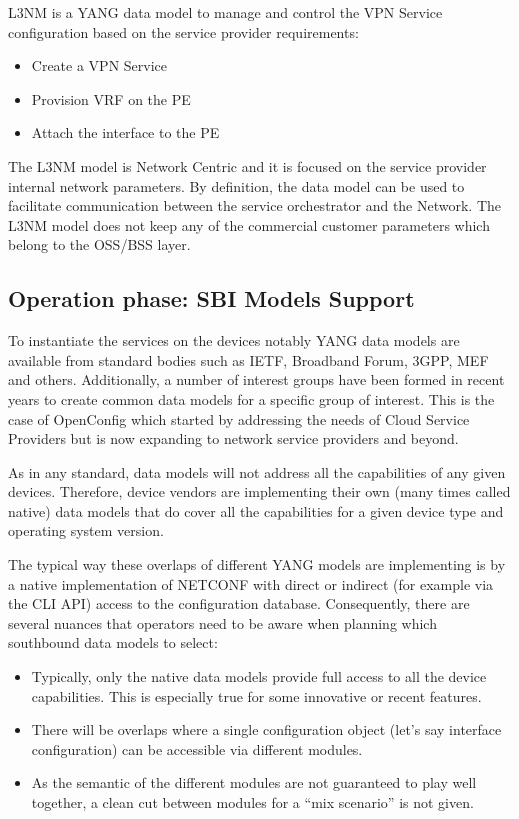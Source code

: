 \documentclass[conference]{IEEEtran}
\begin{document}
L3NM \cite{Aguado:2019aa} is a YANG data model to manage and control the VPN Service configuration based on the service provider requirements:
\begin{itemize}
    \item Create a VPN Service
    \item Provision VRF on the PE
    \item  Attach the interface to the PE
\end{itemize}


The L3NM model is Network Centric and it is focused on the service provider internal network parameters. By definition, the data model can be used to facilitate communication between the service orchestrator and the Network. The L3NM model does not keep any of the commercial customer parameters which belong to the OSS/BSS layer.

\subsection{Operation phase: SBI Models Support}

To instantiate the services on the devices notably YANG data models are available from standard bodies such as IETF, Broadband Forum, 3GPP, MEF and others. Additionally, a number of interest groups have been formed in recent years to create common data models for a specific group of interest. This is the case of OpenConfig which started by addressing the needs of Cloud Service Providers but is now expanding to network service providers and beyond. 

As in any standard, data models will not address all the capabilities of any given devices. Therefore, device vendors are implementing their own (many times called native) data models that do cover all the capabilities for a given device type and operating system version.

The typical way these overlaps of different YANG models are implementing is by a native implementation of NETCONF with direct or indirect (for example via the CLI API) access to the configuration database. Consequently, there are several nuances that operators need to be aware when planning which southbound data models to select:
\begin{itemize}
    \item Typically, only the native data models provide full access to all the device capabilities. This is especially true for some innovative or recent features.
    \item There will be overlaps where a single configuration object (let’s say interface configuration) can be accessible via different modules. 
    \item As the semantic of the different modules are not guaranteed to play well together, a clean cut between modules for a “mix scenario” is not given.
\end{itemize}
\end{document}
